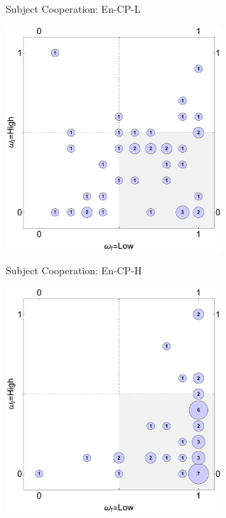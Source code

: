 \documentclass{beamer}
\begin{document}
\begin{frame}{Subject Cooperation: En-CP-L }
\begin{card}
\begin{center}
	\includegraphics[width=0.6\textwidth]{./i/col_subject_stateCooperation_L5_CP_L.pdf}
\end{center}
\end{card}
\end{frame}
\begin{frame}{Subject Cooperation: En-CP-H }
\begin{card}
\begin{center}
	\includegraphics[width=0.6\textwidth]{./i/col_subject_stateCooperation_L5_CP_H.pdf}
\end{center}
\end{card}
\end{frame}
\end{document}
